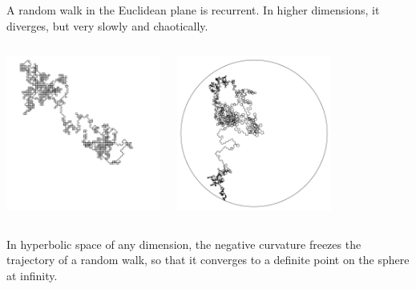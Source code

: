\documentclass{beamer}
\begin{document}
{
A random walk in the Euclidean plane is recurrent. In higher dimensions, it diverges, but
very slowly and chaotically.
\begin{columns}[c]
\column{2in}
\begin{center}
\includegraphics[width=2in]{turtle_Euclid.png}
\end{center}
\column{2in}
\begin{center}
\includegraphics[width=2in]{turtle_hyperbolic.png}
\end{center}
\end{columns}
In hyperbolic space of any dimension, the negative curvature \textcolor{dgreen}{freezes} 
the trajectory of a random walk, so that it converges to a definite point on the sphere
at infinity.
}
\frame
\end{document}
